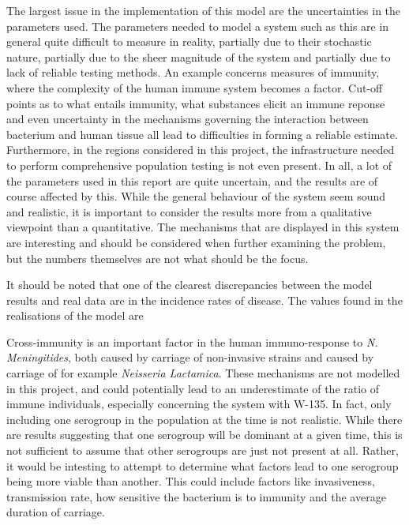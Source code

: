 \documentclass[10pt,a4paper]{article}
\begin{document}
The largest issue in the implementation of this model are the uncertainties in the parameters used. The parameters needed to model a system such as this are in general quite difficult to measure in reality, partially due to their stochastic nature, partially due to the sheer magnitude of the system and partially due to lack of reliable testing methods. An example concerns measures of immunity, where the complexity of the human immune system becomes a factor. Cut-off points as to what entails immunity, what substances elicit an immune reponse and even uncertainty in the mechanisms governing the interaction between bacterium and human tissue all lead to difficulties in forming a reliable estimate. Furthermore, in the regions considered in this project, the infrastructure needed to perform comprehensive population testing is not even present. In all, a lot of the parameters used in this report are quite uncertain, and the results are of course affected by this. While the general behaviour of the system seem sound and realistic, it is important to consider the results more from a qualitative viewpoint than a quantitative. The mechanisms that are displayed in this system are interesting and should be considered when further examining the problem, but the numbers themselves are not what should be the focus.

It should be noted that one of the clearest discrepancies between the model results and real data are in the incidence rates of disease. The values found in the realisations of the model are 

Cross-immunity is an important factor in the human immuno-response to \emph{N. Meningitides}, both caused by carriage of non-invasive strains and caused by carriage of for example \emph{Neisseria Lactamica}. These mechanisms are not modelled in this project, and could potentially lead to an underestimate of the ratio of immune individuals, especially concerning the system with W-135. In fact, only including one serogroup in the population at the time is not realistic. While there are results suggesting that one serogroup will be dominant at a given time, this is not sufficient to assume that other serogroups are just not present at all. Rather, it would be intesting to attempt to determine what factors lead to one serogroup being more viable than another. This could include factors like invasiveness, transmission rate, how sensitive the bacterium is to immunity and the average duration of carriage.
\end{document}
